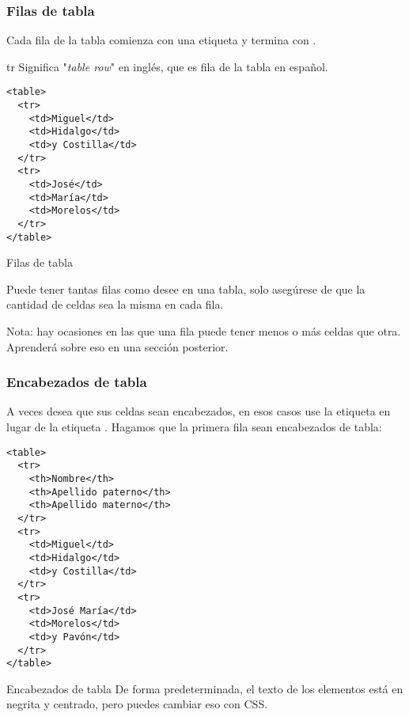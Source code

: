 \begin{frame}[fragile]
  \frametitle{Filas de tabla}

  Cada fila de la tabla comienza con una etiqueta  y
  termina con .

  \begin{exampleblock}{tr}
    Significa "\emph{table row}" en inglés, que es fila de la tabla
    en español.
  \end{exampleblock}

  \begin{lstlisting}
<table>
  <tr>
    <td>Miguel</td>
    <td>Hidalgo</td>
    <td>y Costilla</td>
  </tr>
  <tr>
    <td>José</td>
    <td>María</td>
    <td>Morelos</td>
  </tr>
</table> 
  \end{lstlisting}
\end{frame}

\begin{frame}[c]{Filas de tabla}

  Puede tener tantas filas como desee en una tabla, solo asegúrese
  de que la cantidad de celdas sea la misma en cada fila.

  \vspace{\baselineskip}
  \begin{block}{Nota:}
    hay ocasiones en las que una fila puede tener menos o más celdas
    que otra. Aprenderá sobre eso en una sección posterior.
  \end{block}
\end{frame}

\begin{frame}[fragile]
  \frametitle{Encabezados de tabla}

  A veces desea que sus celdas sean encabezados, en esos casos use la
  etiqueta  en lugar de la etiqueta . Hagamos que
  la primera fila sean encabezados de tabla:

  \begin{lstlisting}
<table>
  <tr>
    <th>Nombre</th>
    <th>Apellido paterno</th>
    <th>Apellido materno</th>
  </tr>
  <tr>
    <td>Miguel</td>
    <td>Hidalgo</td>
    <td>y Costilla</td>
  </tr>
  <tr>
    <td>José María</td>
    <td>Morelos</td>
    <td>y Pavón</td>
  </tr>
</table> 
  \end{lstlisting}
\end{frame}

\begin{frame}[c]{Encabezados de tabla}
  De forma predeterminada, el texto de los elementos 
  está en negrita y centrado, pero puedes cambiar eso con CSS.
\end{frame}

